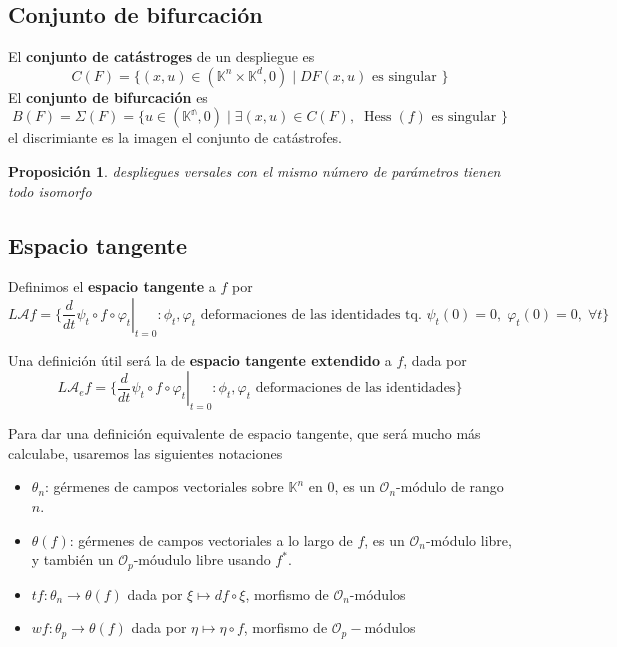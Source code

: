 \documentclass[12pt]{book}
\newtheorem{pro}{Proposición}
\newcommand{\ag}{\mathcal{A}}
\newcommand{\oo}{\mathcal{O}_n}
\begin{document}
\subsection{Conjunto de bifurcación}

El \textbf{conjunto de catástroges} de un despliegue es $$ C(F) = \{ (x,u) \in (\mathbb{K}^n \times \mathbb{K}^d ,0 ) \; | \; DF (x,u) \mbox{ es singular }  \} $$
El \textbf{conjunto de bifurcación} es $$ B(F) = \Sigma (F) = \{ u \in (\mathbb{K^n},0) \; |\; \exists (x,u) \in C(F), \; \operatorname{Hess} (f) \mbox{ es singular } \} $$
el discrimiante es la imagen el conjunto de catástrofes. 
\begin{pro}
despliegues versales con el mismo número de parámetros tienen todo isomorfo
\end{pro}


\subsection{Espacio tangente}


Definimos el \textbf{espacio tangente} a $f$ por $$ L\ag f = \{ \left. \frac{d}{dt} \psi_{t} \circ f \circ \varphi_{t}\right\vert_{ t=0} : \phi_t,\varphi_{t} \mbox{ deformaciones de las identidades tq. } \psi_t (0)=0, \; \varphi_{t} (0)=0 , \; \forall t  \} $$


Una definición útil será la de \textbf{espacio tangente extendido} a $f$, dada por $$ L\ag_e f = \{ \left. \frac{d}{dt} \psi_{t} \circ f \circ \varphi_{t}\right\vert_{ t=0} : \phi_t,\varphi_{t} \mbox{ deformaciones de las identidades} \} $$

Para dar una definición equivalente de espacio tangente, que será mucho más calculabe, usaremos las siguientes notaciones
\begin{itemize}
	\item $\theta_n$: gérmenes de campos vectoriales sobre $\mathbb{K}^n$ en $0$, es un $\oo$-módulo de rango $n$.
	\item $\theta(f)$: gérmenes de campos vectoriales a lo largo de $f$, es un $\oo$-módulo libre, y también un $\mathcal{O}_p$-móudulo libre usando $f^*$.
	\item $tf:\theta_n \rightarrow \theta(f)$ dada por $\xi \mapsto df \circ \xi$, morfismo de $\oo$-módulos
	\item $wf : \theta _p \rightarrow \theta(f)$ dada por $ \eta \mapsto \eta \circ f$, morfismo de $\mathcal{O}_p-$módulos
\end{itemize}
\end{document}
